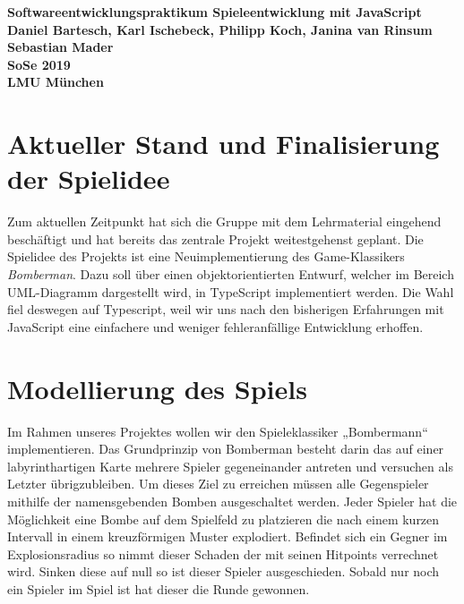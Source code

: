 \documentclass[10pt, a4paper]{report}
\begin{document}
		\begin{center}
		\huge \textbf{Softwareentwicklungspraktikum Spieleentwicklung mit JavaScript}\\
		\vspace{1cm}
		\small 
		\textbf{Daniel Bartesch, Karl Ischebeck, Philipp Koch, Janina van Rinsum}	\\
		\textbf{Sebastian Mader}									\\
		\textbf{SoSe 2019}											\\
		\textbf{LMU München}
		\vspace{1cm}
	\end{center}
	\section{Aktueller Stand und Finalisierung der Spielidee}
	Zum aktuellen Zeitpunkt hat sich die Gruppe mit dem Lehrmaterial eingehend beschäftigt und hat bereits das zentrale Projekt weitestgehenst geplant. Die Spielidee des Projekts ist eine Neuimplementierung des Game-Klassikers \textit{Bomberman}. Dazu soll über einen objektorientierten Entwurf, welcher im Bereich UML-Diagramm dargestellt wird, in TypeScript implementiert werden. Die Wahl fiel deswegen auf Typescript, weil wir uns nach den bisherigen Erfahrungen mit JavaScript eine einfachere und weniger fehleranfällige Entwicklung erhoffen. \\
	\section{Modellierung des Spiels}
	Im Rahmen unseres Projektes wollen wir den Spieleklassiker „Bombermann“ implementieren. Das Grundprinzip von Bomberman besteht darin das auf einer labyrinthartigen Karte mehrere Spieler gegeneinander antreten und versuchen als Letzter übrigzubleiben. Um dieses Ziel zu erreichen müssen alle Gegenspieler mithilfe der namensgebenden Bomben ausgeschaltet werden. Jeder Spieler hat die Möglichkeit eine Bombe auf dem Spielfeld zu platzieren die nach einem kurzen Intervall in einem kreuzförmigen Muster explodiert. Befindet sich ein Gegner im Explosionsradius so nimmt dieser Schaden der mit seinen Hitpoints verrechnet wird. Sinken diese auf null so ist dieser Spieler ausgeschieden. Sobald nur noch ein Spieler im Spiel ist hat dieser die Runde gewonnen.
\end{document}
